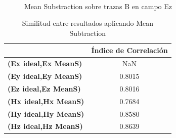 \begin{figure}[H]  
\centering
{}\\
\caption{Mean Substraction sobre trazas B en campo Ez}
\label{fig:bscanMeanSubs1}
\end{figure}


\begin{table}[H]
\begin{center}
\caption{Similitud entre resultados aplicando Mean Subtraction} \label{tab:corrcoefMean}
\begin{tabular}{l|c}
 & \multicolumn{1}{l}{\textbf{Índice de Correlación}} \\ \hline
\textbf{(Ex ideal,Ex MeanS)} & NaN \\
\textbf{(Ey ideal,Ey MeanS)} & 0.8015 \\
\textbf{(Ez ideal,Ez MeanS)} & 0.8016 \\
\textbf{(Hx ideal,Hx MeanS)} & 0.7684 \\
\textbf{(Hy ideal,Hy MeanS)} & 0.8580 \\
\textbf{(Hz ideal,Hz MeanS)} & 0.8639
\end{tabular}
\end{center}
\end{table} 


